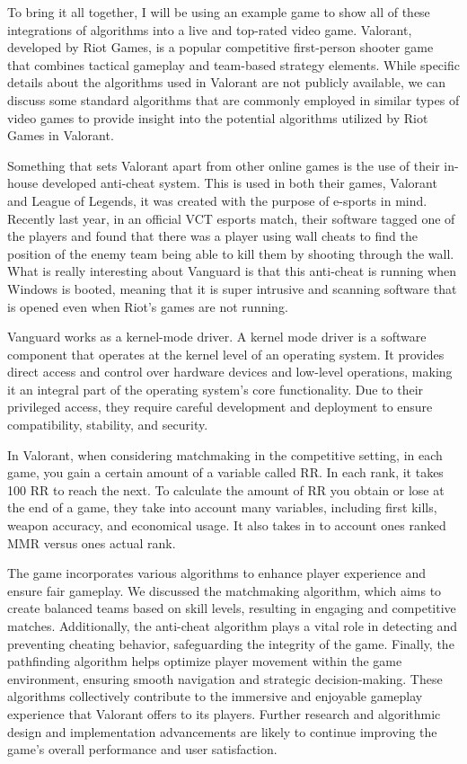 \documentclass{article}
\theoremstyle{theorem}
\theoremstyle{definition}
\theoremstyle{remark}
\begin{document}
\medskip\indent
To bring it all together, I will be using an example game to show all of these integrations of algorithms into a live and top-rated video game. Valorant, developed by Riot Games, is a popular competitive first-person shooter game that combines tactical gameplay and team-based strategy elements. While specific details about the algorithms used in Valorant are not publicly available, we can discuss some standard algorithms that are commonly employed in similar types of video games to provide insight into the potential algorithms utilized by Riot Games in Valorant.

\medskip\indent
Something that sets Valorant apart from other online games is the use of their in-house developed anti-cheat system.\cite{Van} This is used in both their games, Valorant and League of Legends, it was created with the purpose of e-sports in mind. Recently last year, in an official VCT esports match, their software tagged one of the players and found that there was a player using wall cheats to find the position of the enemy team being able to kill them by shooting through the wall. What is really interesting about Vanguard is that this anti-cheat is running when Windows is booted, meaning that it is super intrusive and scanning software that is opened even when Riot’s games are not running.

\medskip\indent
Vanguard works as a kernel-mode driver. A kernel mode driver is a software component that operates at the kernel level of an operating system. It provides direct access and control over hardware devices and low-level operations, making it an integral part of the operating system's core functionality. Due to their privileged access, they require careful development and deployment to ensure compatibility, stability, and security.

\medskip\indent
In Valorant, when considering matchmaking in the competitive setting, in each game, you gain a certain amount of a variable called RR. In each rank, it takes 100 RR to reach the next. To calculate the amount of RR you obtain or lose at the end of a game, they take into account many variables, including first kills, weapon accuracy, and economical usage. It also takes in to account ones ranked MMR versus ones actual rank.

\medskip\indent
The game incorporates various algorithms to enhance player experience and ensure fair gameplay. We discussed the matchmaking algorithm, which aims to create balanced teams based on skill levels, resulting in engaging and competitive matches. Additionally, the anti-cheat algorithm plays a vital role in detecting and preventing cheating behavior, safeguarding the integrity of the game. Finally, the pathfinding algorithm helps optimize player movement within the game environment, ensuring smooth navigation and strategic decision-making. These algorithms collectively contribute to the immersive and enjoyable gameplay experience that Valorant offers to its players. Further research and algorithmic design and implementation advancements are likely to continue improving the game's overall performance and user satisfaction.
\end{document}
